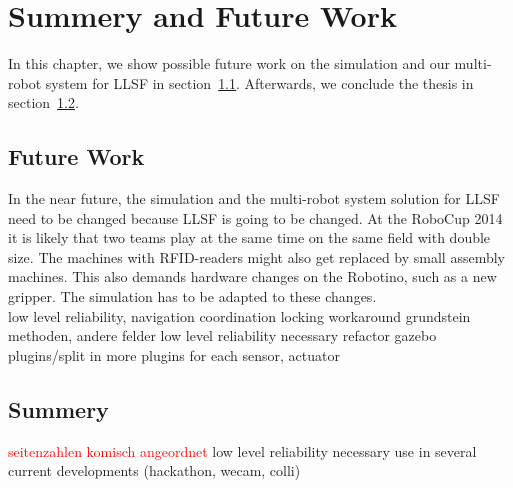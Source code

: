 \chapter{Summery and Future Work}
\label{cha:summery_and_future_work}
In this chapter, we show possible future work on the simulation and our multi-robot system for LLSF in section~\ref{sec:future_work}. Afterwards, we conclude the thesis in section~\ref{sec:summery}.

\section{Future Work}
\label{sec:future_work}
In the near future, the simulation and the multi-robot system solution for LLSF need to be changed because LLSF is going to be changed. At the RoboCup 2014 it is likely that two teams play at the same time on the same field with double size. The machines with RFID-readers might also get replaced by small assembly machines. This also demands hardware changes on the Robotino, such as a new gripper. The simulation has to be adapted to these changes.\\



low level reliability, navigation coordination
locking workaround
grundstein methoden, andere felder
low level reliability necessary
refactor gazebo plugins/split in more plugins for each sensor, actuator

\section{Summery}
\label{sec:summery}

\textcolor{red}{seitenzahlen komisch angeordnet}
low level reliability necessary
use in several current developments (hackathon, wecam, colli)
